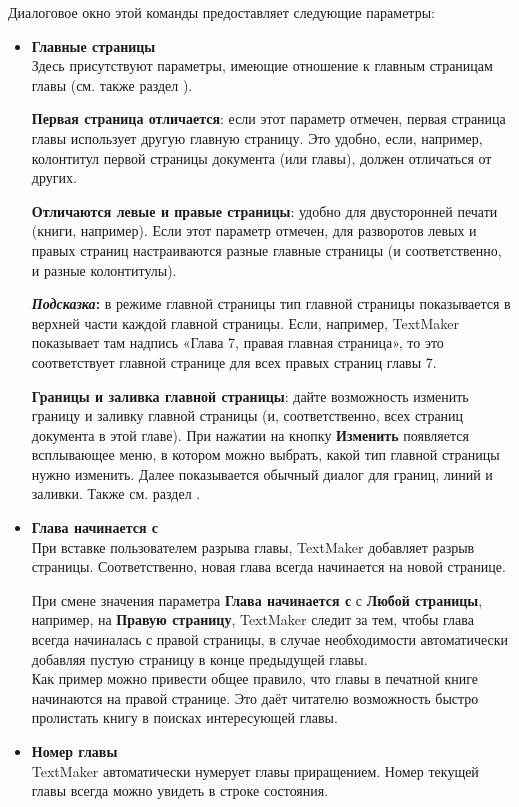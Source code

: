 ﻿\documentclass[a4paper,10pt]{article}
\begin{document}
Диалоговое окно этой команды предоставляет следующие параметры:
\begin{itemize}
 \item \textbf{Главные страницы}\\
 Здесь присутствуют параметры, имеющие отношение к главным страницам главы (см. также раздел ).
 
 \textbf{Первая страница отличается}: если этот параметр отмечен, первая страница главы использует другую главную страницу. Это удобно, если, например, колонтитул первой страницы документа (или главы), должен отличаться от других.
 
 \textbf{Отличаются левые и правые страницы}: удобно для двусторонней печати (книги, например). Если этот параметр отмечен, для разворотов левых и правых страниц настраиваются разные главные страницы (и соответственно, и разные колонтитулы).\\
 \begin{mdframed}[backgroundcolor=blue!10]
\textbf{\textit{Подсказка}:} в режиме главной страницы тип главной страницы показывается в верхней части каждой главной страницы. Если, например, TextMaker показывает там надпись «Глава 7, правая главная страница», то это соответствует главной странице для всех правых страниц главы 7.
\end{mdframed}

\textbf{Границы и заливка главной страницы}: дайте возможность изменить границу и заливку главной страницы (и, соответственно, всех страниц документа в этой главе). При нажатии на кнопку \textbf{Изменить} появляется всплывающее меню, в котором можно выбрать, какой тип главной страницы нужно изменить. Далее показывается обычный диалог для границ, линий и заливки. Также см. раздел .
\item \textbf{Глава начинается с}\\
При вставке пользователем разрыва главы, TextMaker добавляет разрыв страницы. Соответственно, новая глава всегда начинается на новой странице.

При смене значения параметра \textbf{Глава начинается с} с \textbf{Любой страницы}, например, на \textbf{Правую страницу}, TextMaker следит за тем, чтобы глава всегда начиналась с правой страницы, в случае необходимости автоматически добавляя пустую страницу в конце предыдущей главы.\\
Как пример можно привести общее правило, что главы в печатной книге начинаются на правой странице. Это даёт читателю возможность быстро пролистать книгу в поисках интересующей главы.
\item \textbf{Номер главы}\\
TextMaker автоматически нумерует главы приращением. Номер текущей главы всегда можно увидеть в строке состояния.


\end{itemize}
\end{document}
